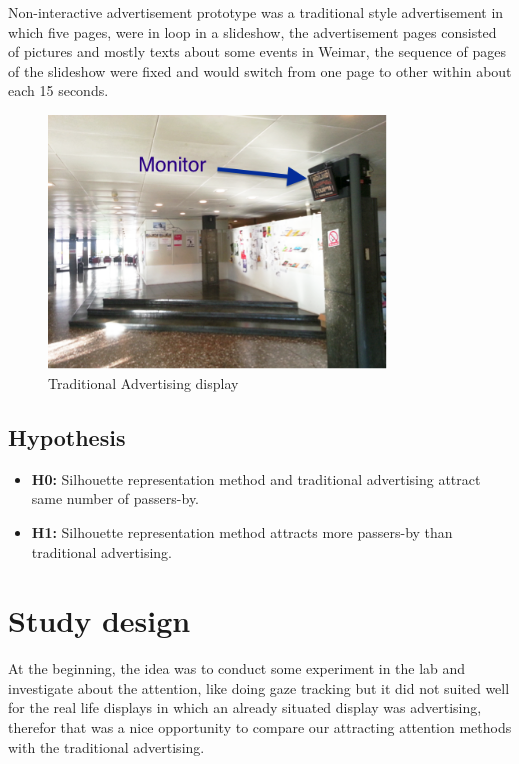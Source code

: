 Non-interactive advertisement prototype was a traditional style advertisement in which five pages, were in loop in a slideshow, the advertisement pages consisted of pictures and mostly texts about some events in Weimar, the sequence of pages of the slideshow were fixed and would switch from one page to other within about each 15 seconds.

\begin{figure}[H]
\centering
    \includegraphics[width=0.8\textwidth,height=0.35\textheight]{Figures/3/Kasseturm_monitor}
    \caption{Traditional Advertising display}
    \label{fig:kassAdvertising}
\end{figure}


\subsection{Hypothesis}

\begin{itemize}
\item \textbf{H0:} Silhouette representation method and traditional advertising attract same number of passers-by.
\item \textbf{H1:} Silhouette representation method attracts more passers-by than traditional advertising.

\end{itemize}



\section{Study design}
At the beginning, the idea was to conduct some experiment in the lab and investigate about the attention, like doing gaze tracking but it did not suited well for the real life displays in which an already situated display was advertising, therefor that was a nice opportunity to compare our attracting attention methods with the traditional advertising.  

